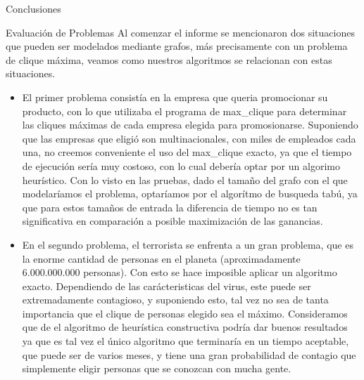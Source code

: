 \documentclass[12pt,titlepage]{article}
\newcommand{\tab}{\hspace*{2em}}
\begin{document}
\begin{section}{Conclusiones}
		\begin{subsection}{Evaluación de Problemas}
		\tab Al comenzar el informe se mencionaron dos situaciones que pueden ser modelados mediante grafos, más precisamente con un problema de clique máxima, veamos como nuestros algoritmos se relacionan con estas situaciones. 
			\begin{itemize}
			\item El primer problema consistía en la empresa que queria promocionar su producto, con lo que utilizaba el programa de max\_clique para determinar las cliques máximas de cada empresa elegida para promosionarse. Suponiendo que las empresas que eligió son multinacionales, con miles de empleados cada una, no creemos conveniente el uso del max\_clique exacto, ya que el tiempo de ejecución sería muy costoso, con lo cual debería optar por un algorimo heurístico. Con lo visto en las pruebas, dado el tamaño del grafo con el que modelaríamos el problema, optaríamos por el algorítmo de busqueda tabú, ya que para estos tamaños de entrada la diferencia de tiempo no es tan significativa en comparación a posible maximización de las ganancias.
			\item En el segundo problema, el terrorista se enfrenta a un gran problema, que es la enorme cantidad de personas en el planeta (aproximadamente 6.000.000.000 personas). Con esto se hace imposible aplicar un algoritmo exacto. Dependiendo de las carácteristicas del virus, este puede ser extremadamente contagioso, y suponiendo esto, tal vez no sea de tanta importancia que el clique de personas elegido sea el máximo. Consideramos que de el algoritmo de heurística constructiva podría dar buenos resultados ya que es tal vez el único algoritmo que terminaría en un tiempo aceptable, que puede ser de varios meses, y tiene una gran probabilidad de contagio que simplemente eligir personas que se conozcan con mucha gente.
			\end{itemize}
		\end{subsection}
	
	\end{section}
	
\end{document}
